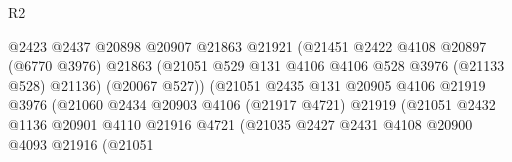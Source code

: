 \begin{lexlean}{R2}
\begin{coremodule}
                                          @2423
                                          @2437
                                          @20898
                                          @20907
                                          @21863
                                          @21921
                                          (@21451
                                            @2422
                                            @4108
                                            @20897
                                            (@6770 @3976)
                                            @21863
                                            (@21051
                                              @529
                                              @131
                                              @4106
                                              @4106
                                              @528
                                              @3976
                                              (@21133 @528)
                                              @21136)
                                            (@20067 @527))
                                          (@21051
                                            @2435
                                            @131
                                            @20905
                                            @4106
                                            @21919
                                            @3976
                                            (@21060
                                              @2434
                                              @20903
                                              @4106
                                              (@21917 @4721)
                                              @21919
                                              (@21051
                                                @2432
                                                @1136
                                                @20901
                                                @4110
                                                @21916
                                                @4721
                                                (@21035
                                                  @2427
                                                  @2431
                                                  @4108
                                                  @20900
                                                  @4093
                                                  @21916
                                                  (@21051

\end{coremodule}
\end{lexlean}
